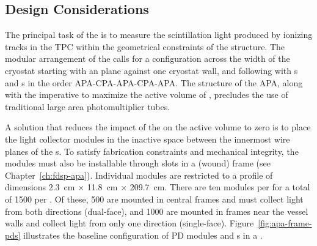 \subsection{Design Considerations}
\label{sec:fdsp-pd-des-consid}

The principal task of the   is to measure the  scintillation light produced by ionizing tracks in the TPC within the geometrical constraints of the  structure. The modular arrangement of the  calls for a configuration across the width of the cryostat starting with an  plane against one cryostat wall, and following with s and s in the order  APA-CPA-APA-CPA-APA.
The structure of the APA, along with the imperative to maximize the active volume of , precludes the use of traditional large area photomultiplier tubes.  

A solution that reduces the impact of the  on the active volume to zero is to place the light collector modules in the inactive space between the innermost wire planes of the s. To satisfy  fabrication constraints and mechanical integrity, the modules must also be installable through slots in a (wound)  frame (see Chapter~\ref{ch:fdsp-apa}).  Individual  modules are restricted to a profile of dimensions \SI{2.3}{cm} $\times$ \SI{11.8}{cm} $\times$ \SI{209.7}{cm}.  There are ten  modules per  for a total of \num{1500} per .  Of these, \num{500} are mounted in central  frames and must collect light from both directions (dual-face), and \num{1000} are mounted in frames  near the vessel walls and collect light from only one direction (single-face).
Figure~\ref{fig:apa-frame-pds} illustrates the baseline configuration of PD modules and s in a . 


